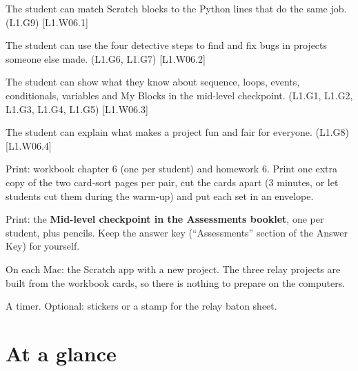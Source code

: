 
\begin{objectives}
  \item The student can match Scratch blocks to the Python lines that do the same job. (L1.G9) [L1.W06.1]
  \item The student can use the four detective steps to find and fix bugs in projects someone else made. (L1.G6, L1.G7) [L1.W06.2]
  \item The student can show what they know about sequence, loops, events, conditionals, variables and My Blocks in the mid-level checkpoint. (L1.G1, L1.G2, L1.G3, L1.G4, L1.G5) [L1.W06.3]
  \item The student can explain what makes a project fun and fair for everyone. (L1.G8) [L1.W06.4]
\end{objectives}

\begin{materials}
  \item Print: workbook chapter 6 (one per student) and homework 6. Print one extra copy of the two card-sort pages per pair, cut the cards apart (3 minutes, or let students cut them during the warm-up) and put each set in an envelope.
  \item Print: the \textbf{Mid-level checkpoint in the Assessments booklet}, one per student, plus pencils. Keep the answer key (\enquote{Assessments} section of the Answer Key) for yourself.
  \item On each Mac: the Scratch app with a new project. The three relay projects are built from the workbook cards, so there is nothing to prepare on the computers.
  \item A timer. Optional: stickers or a stamp for the relay baton sheet.
\end{materials}

\section{At a glance}
\begin{timeplan}
\end{timeplan}

